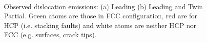\documentclass{article}
\begin{document}
\begin{figure}[H]%
\centering%
%
%
\\
\caption{Observed dislocation emissions: (a) Leading (b) Leading and Twin Partial.
Green atoms are those in FCC configuration, red are for HCP (i.e. stacking faults) and white atoms are neither HCP nor FCC (e.g. surfaces, crack tips).}
\label{fig:fracturedislocation_images}
\end{figure}
\end{document}
